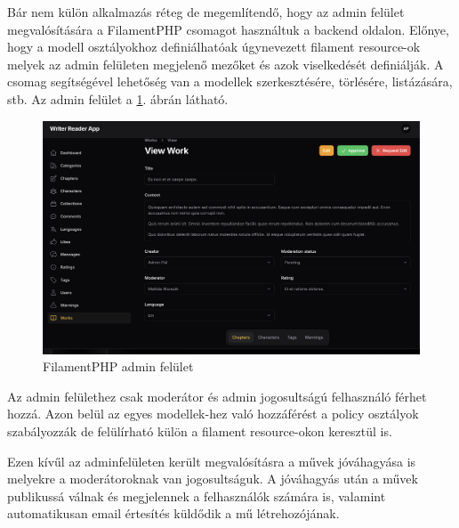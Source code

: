Bár nem külön alkalmazás réteg de megemlítendő, hogy az admin felület megvalósítására a FilamentPHP csomagot \cite{FilamentPHP} használtuk a backend oldalon. Előnye, hogy a modell osztályokhoz definiálhatóak úgynevezett filament resource-ok melyek az admin felületen megjelenő mezőket és azok viselkedését definiálják. A csomag segítségével lehetőség van a modellek szerkesztésére, törlésére, listázására, stb. Az admin felület a \ref{fig:admin}. ábrán látható.

\begin{figure}[H]
    \centering
    \includegraphics[scale=0.25]{./figures/admin-panel.png}
    \caption{FilamentPHP admin felület}
    \label{fig:admin}
\end{figure}

Az admin felülethez csak moderátor és admin jogosultságú felhasználó férhet hozzá. Azon belül az egyes modellek-hez való hozzáférést a policy osztályok szabályozzák de felülírható külön a filament resource-okon keresztül is.

Ezen kívűl az adminfelületen került megvalósításra a művek jóváhagyása is melyekre a moderátoroknak van jogosultságuk. A jóváhagyás után a művek publikussá válnak és megjelennek a felhasználók számára is, valamint automatikusan email értesítés küldődik a mű létrehozójának.
